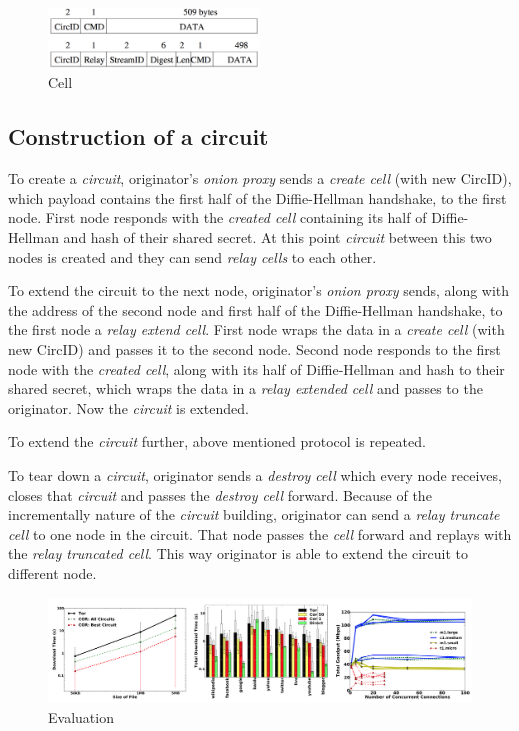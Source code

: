 \documentclass{acm_proc_article-sp}
\begin{document}
\begin{figure}
    \centering
    \includegraphics[width=0.5\textwidth]{cell.png}
    \caption{Cell \cite{cite6}}
    \label{fig:cell_image}
\end{figure}

\subsection{Construction of a circuit}

To create a \textit{circuit}, originator's \textit{onion proxy} sends a \textit{create cell} (with new CircID), which payload contains the first half of the Diffie-Hellman handshake, to the first node. First node responds with the \textit{created cell} containing its half of Diffie-Hellman and hash of their shared secret. At this point \textit{circuit} between this two nodes is created and they can send \textit{relay cells} to each other.  \cite{cite6}

To extend the circuit to the next node, originator's \textit{onion proxy} sends, along with the address of the second node and first half of the Diffie-Hellman handshake, to the first node a \textit{relay extend cell}. First node wraps the data in a \textit{create cell} (with new CircID) and passes it to the second node. Second node responds to the first node with the \textit{created cell}, along with its half of Diffie-Hellman and hash to their shared secret, which wraps the data in a \textit{relay extended cell} and passes to the originator. Now the \textit{circuit} is extended. \cite{cite6}

To extend the \textit{circuit} further, above mentioned protocol is repeated.

To tear down a \textit{circuit}, originator sends a \textit{destroy cell} which every node receives, closes that \textit{circuit} and passes the \textit{destroy cell} forward. Because of the incrementally nature of the \textit{circuit} building, originator can send a \textit{relay truncate cell} to one node in the circuit. That node passes the \textit{cell} forward and replays with the \textit{relay truncated cell}. This way originator is able to extend the circuit to different node. \cite{cite6}

\begin{figure}
    \centering
    \includegraphics[width=1\textwidth]{evaluation.png}
    \caption{Evaluation \cite{cite2}}
    \label{fig:eval_image}
\end{figure}
\end{document}
